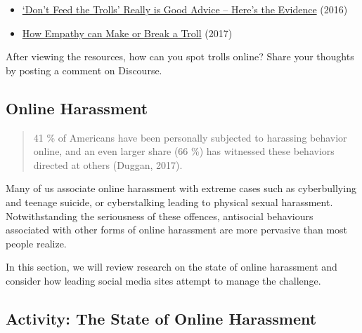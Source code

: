 \documentclass[
  letterpaper,
  DIV=11,
  numbers=noendperiod]{scrreprt}
\providecommand{\tightlist}{%
  \setlength{\itemsep}{0pt}\setlength{\parskip}{0pt}}\usepackage{longtable,booktabs,array}
\begin{document}
\begin{tcolorbox}
\begin{itemize}
  \begin{itemize}
  \tightlist
  \item
    \href{https://theconversation.com/dont-feed-the-trolls-really-is-good-advice-heres-the-evidence-63657}{`Don't
    Feed the Trolls' Really is Good Advice -- Here's the Evidence}
    (2016)
  \item
    \href{https://theconversation.com/how-empathy-can-make-or-break-a-troll-80680}{How
    Empathy can Make or Break a Troll} (2017)
  \end{itemize}
\end{itemize}

After viewing the resources, how can you spot trolls online? Share your
thoughts by posting a comment on Discourse.

\end{tcolorbox}

\subsection*{Online Harassment}\label{online-harassment}

\begin{quote}
41 \% of Americans have been personally subjected to harassing behavior
online, and an even larger share (66 \%) has witnessed these behaviors
directed at others (Duggan, 2017).
\end{quote}

Many of us associate online harassment with extreme cases such as
cyberbullying and teenage suicide, or cyberstalking leading to physical
sexual harassment. Notwithstanding the seriousness of these offences,
antisocial behaviours associated with other forms of online harassment
are more pervasive than most people realize.

In this section, we will review research on the state of online
harassment and consider how leading social media sites attempt to manage
the challenge.

\subsection{Activity: The State of Online
Harassment}\label{activity-the-state-of-online-harassment}
\end{document}
